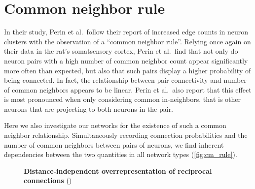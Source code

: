 
\section{Common neighbor rule}


In their study, Perin et al.\ follow their report of increased
  edge counts
in neuron clusters with the observation of a \enquote{common neighbor
  rule}. Relying once again on their data
in the rat's somatsensory cortex, Perin et al.\ find that not only do
neuron pairs with a high number of common neighbor count appear
significantly more often than expected, but also that such pairs
display a higher probability of being connected. In fact, the
relationship between pair connectivity and number of common neighbors
appears to be linear. Perin et al.\ also report that this effect is
most pronounced when only considering common in-neighbors, that is
other neurons that are projecting to both neurons in the pair.

Here we also investigate our networks for the existence of such a
common neighbor relationship. Simultaneously recording connection
probabilities and the number of common neighbors between pairs of
neurons, we find inherent dependencies between the two quantities in
all network types (\autoref{fig:cm_rule}). 


\begin{figure}[H]
  \centering
  \vfill
  \vspace{0.11cm}
  \vfill
  \vspace{0.11cm}
  \captionsetup{skip=7pt}
  \caption{\textbf{Distance-independent overrepresentation of
      reciprocal connections}  ()}
  \label{fig:cm_rule}
\end{figure}


